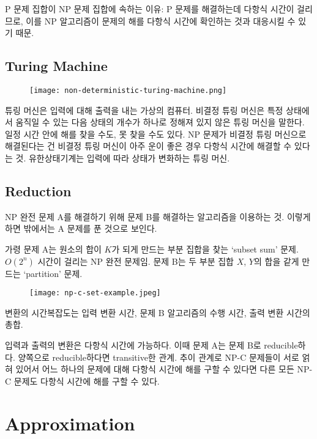 P 문제 집합이 NP 문제 집합에 속하는 이유: P 문제를 해결하는데 다항식 시간이 걸리므로, 이를 NP 알고리즘이 문제의 해를 다항식 시간에 확인하는 것과 대응시킬 수 있기 때문.

\subsection{Turing Machine}

\begin{figure}[h]
  \centering
  \texttt{[image: non-deterministic-turing-machine.png]}
\end{figure}

튜링 머신은 입력에 대해 출력을 내는 가상의 컴퓨터. 비결정 튜링 머신은 특정 상태에서 움직일 수 있는 다음 상태의 개수가 하나로 정해져 있지 않은 튜링 머신을 말한다. 일정 시간 안에 해를 찾을 수도, 못 찾을 수도 있다. NP 문제가 비결정 튜링 머신으로 해결된다는 건 비결정 튜링 머신이 아주 운이 좋은 경우 다항식 시간에 해결할 수 있다는 것. 유한상태기계는 입력에 따라 상태가 변화하는 튜링 머신.

\subsection{Reduction}

NP 완전 문제 A를 해결하기 위해 문제 B를 해결하는 알고리즘을 이용하는 것. 이렇게 하면 밖에서는 A 문제를 푼 것으로 보인다.

가령 문제 A는 원소의 합이 $K$가 되게 만드는 부분 집합을 찾는 `subset sum' 문제. $O(2^n)$ 시간이 걸리는 NP 완전 문제임. 문제 B는 두 부분 집합 $X$, $Y$의 합을 같게 만드는 `partition' 문제.

\begin{figure}[h]
  \centering
  \texttt{[image: np-c-set-example.jpeg]}
\end{figure}

변환의 시간복잡도는 입력 변환 시간, 문제 B 알고리즘의 수행 시간, 출력 변환 시간의 총합.

입력과 출력의 변환은 다항식 시간에 가능하다. 이때 문제 A는 문제 B로 reducible하다. 양쪽으로 reducible하다면 transitive한 관계. 추이 관계로 NP-C 문제들이 서로 얽혀 있어서 어느 하나의 문제에 대해 다항식 시간에 해를 구할 수 있다면 다른 모든 NP-C 문제도 다항식 시간에 해를 구할 수 있다.

\section{Approximation}

